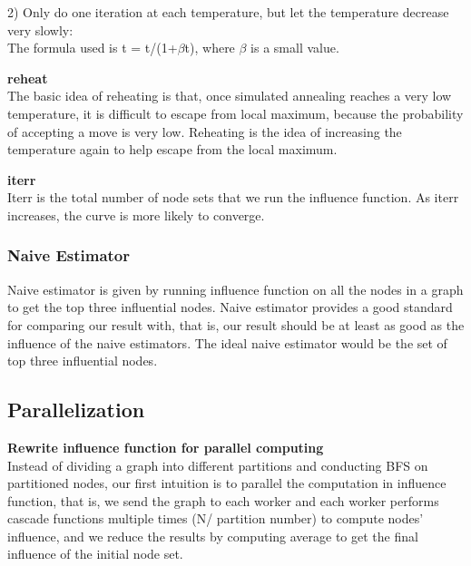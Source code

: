 \documentclass{article}
\begin{document}
\begin{enumerate}
\begin{item}
2) Only do one iteration at each temperature, but let the temperature decrease very slowly: \\
\-\hspace{0.5cm}The formula used is t = t/(1+$\beta$t), where $\beta$ is a small value.

\end{item}

\begin{item}%
\textbf{reheat}\\
The basic idea of reheating is that, once simulated annealing reaches a very low temperature, it is difficult to escape from local maximum, because the probability of accepting a move is very low. Reheating is the idea of increasing the temperature again to help escape from the local maximum.
\end{item}


\begin{item}%
\textbf{iterr}\\
Iterr is the total number of node sets that we run the influence function. As iterr increases, the curve is more likely to converge. \\

\end{item}
\end{enumerate}


\subsubsection{Naive Estimator}   %
Naive estimator is given by running influence function on all the nodes in a graph to get the top three influential nodes. Naive estimator provides a good standard for comparing our result with, that is, our result should be at least as good as the influence of the naive estimators. The ideal naive estimator would be the set of top three influential nodes.  

\subsection{Parallelization}   %
\textbf{Rewrite influence function for parallel computing} \\
Instead of dividing a graph into different partitions and conducting BFS on partitioned nodes, our first intuition is to parallel the computation in influence function, that is, we send the graph to each worker and each worker performs cascade functions multiple times (N/ partition number) to compute nodes' influence, and we reduce the results by computing average to get the final influence of the initial node set. \\
\end{document}
